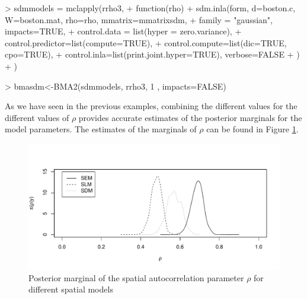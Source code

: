 \documentclass[article]{jss}
\begin{document}
\begin{Schunk}
\begin{Sinput}
> sdmmodels = mclapply(rrho3,
+         function(rho) {
+                 sdm.inla(form, d=boston.c, W=boston.mat, rho=rho, mmatrix=mmatrixsdm,
+                         family = "gaussian", impacts=TRUE,
+                         control.data = list(hyper = zero.variance),
+                         control.predictor=list(compute=TRUE),
+                         control.compute=list(dic=TRUE, cpo=TRUE),
+                         control.inla=list(print.joint.hyper=TRUE), verbose=FALSE
+                 )
+         })
\end{Sinput}
\end{Schunk}

\begin{Schunk}
\begin{Sinput}
> bmasdm<-BMA2(sdmmodels, rrho3, 1 , impacts=FALSE)
\end{Sinput}
\end{Schunk}

As we have seen in the previous examples, combining the different values 
for the different values of $\rho$ provides accurate estimates of the posterior
marginals for the model parameters. The estimates of the marginals of
$\rho$ can be found in Figure \ref{fig:pmargrho}.

\begin{figure}[h]
\begin{center}
\includegraphics{spatial_inla-044}
\end{center}
\caption{Posterior marginal of the spatial autocorrelation parameter $\rho$
for different spatial models}
\label{fig:pmargrho}
\end{figure} 



\end{document}
